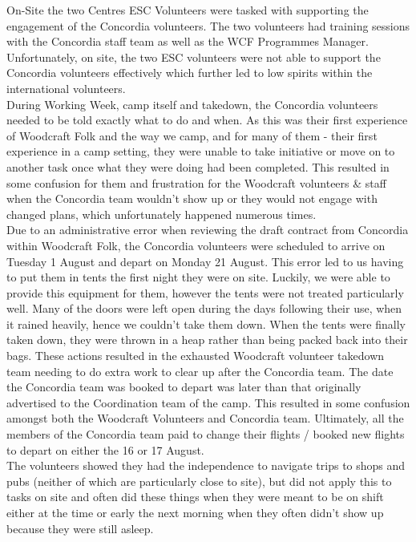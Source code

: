 On-Site the two Centres ESC Volunteers were tasked with supporting the engagement of the Concordia volunteers. The two volunteers had training sessions with the Concordia staff team as well as the WCF Programmes Manager. Unfortunately, on site, the two ESC volunteers were not able to support the Concordia volunteers effectively which further led to low spirits within the international volunteers.\\

During Working Week, camp itself and takedown, the Concordia volunteers needed to be told exactly what to do and when. As this was their first experience of Woodcraft Folk and the way we camp, and for many of them - their first experience in a camp setting, they were unable to take initiative or move on to another task once what they were doing had been completed. This resulted in some confusion for them and frustration for the Woodcraft volunteers \& staff when the Concordia team wouldn't show up or they would not engage with changed plans, which unfortunately happened numerous times.\\

Due to an administrative error when reviewing the draft contract from Concordia within Woodcraft Folk, the Concordia volunteers were scheduled to arrive on Tuesday 1 August and depart on Monday 21 August. This error led to us having to put them in tents the first night they were on site. Luckily, we were able to provide this equipment for them, however the tents were not treated particularly well. Many of the doors were left open during the days following their use, when it rained heavily, hence we couldn't take them down. When the tents were finally taken down, they were thrown in a heap rather than being packed back into their bags. These actions resulted in the exhausted Woodcraft volunteer takedown team needing to do extra work to clear up after the Concordia team.
The date the Concordia team was booked to depart was later than that originally advertised to the Coordination team of the camp. This resulted in some confusion amongst both the Woodcraft Volunteers and Concordia team. Ultimately, all the members of the Concordia team paid to change their flights / booked new flights to depart on either the 16 or 17 August. \\

The volunteers showed they had the independence to navigate trips to shops and pubs (neither of which are particularly close to site), but did not apply this to tasks on site and often did these things when they were meant to be on shift either at the time or early the next morning when they often didn't show up because they were still asleep.\\


